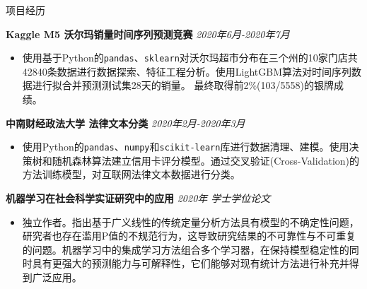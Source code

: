 \documentclass{resume} %
\begin{document}
\begin{rSection}{\noindent 项目经历}
\begin{spacing}{0.1}  
{\bf Kaggle M5 沃尔玛销量时间序列预测竞赛} \hfill {\em 2020年6月-2020年7月 \quad } 
\begin{itemize}
\item 使用基于Python的\texttt{pandas}、\texttt{sklearn}对沃尔玛超市分布在三个州的10家门店共 42840条数据进行数据探索、特征工程分析。使用LightGBM算法对时间序列数据进行拟合并预测测试集28天的销量。 最终取得前2\%(103/5558)的银牌成绩。 \
\end{itemize}
{\bf 中南财经政法大学 \quad 法律文本分类} \hfill{\em 2020年2月-2020年3月} 
\begin{itemize}
\item 使用Python的\texttt{pandas}、\texttt{numpy}和\texttt{scikit-learn}库进行数据清理、建模。使用决策树和随机森林算法建立信用卡评分模型。通过交叉验证(Cross-Validation)的方法训练模型，对互联网法律文本数据进行分类。
\end{itemize}

{\bf 机器学习在社会科学实证研究中的应用} \hfill {\em 2020年 \quad 学士学位论文 }
\begin{itemize}
\item 独立作者。指出基于广义线性的传统定量分析方法具有模型的不确定性问题，研究者也存在滥用P值的不规范行为，这导致研究结果的不可靠性与不可重复的问题。机器学习中的集成学习方法组合多个学习器，在保持模型稳定性的同时具有更强大的预测能力与可解释性，它们能够对现有统计方法进行补充并得到广泛应用。\\
\end{itemize}


\end{spacing}
\end{rSection}
\end{document}
